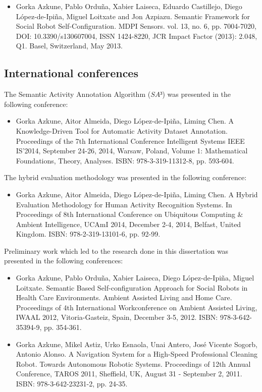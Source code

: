 \begin{itemize}
 \item Gorka Azkune, Pablo Orduña, Xabier Laiseca, Eduardo Castillejo, Diego López-de-Ipiña, Miguel Loitxate and Jon Azpiazu. Semantic Framework for Social Robot Self-Configuration. MDPI Sensors. vol. 13, no. 6, pp. 7004-7020, DOI: 10.3390/s130607004, ISSN 1424-8220, JCR Impact Factor (2013): 2.048, Q1. Basel, Switzerland, May 2013.
\end{itemize}

\subsection{International conferences}

The Semantic Activity Annotation Algorithm ($SA³$) was presented in the following conference:

\begin{itemize}
 \item Gorka Azkune, Aitor Almeida, Diego López-de-Ipiña, Liming Chen. A Knowledge-Driven Tool for Automatic Activity Dataset Annotation. Proceedings of the 7th International Conference Intelligent Systems IEEE IS’2014, September 24-26, 2014, Warsaw, Poland, Volume 1: Mathematical Foundations, Theory, Analyses. ISBN: 978-3-319-11312-8, pp. 593-604.
\end{itemize}

The hybrid evaluation methodology was presented in the following conference:

\begin{itemize}
 \item Gorka Azkune, Aitor Almeida, Diego López-de-Ipiña, Liming Chen. A Hybrid Evaluation Methodology for Human Activity Recognition Systems. In Proceedings of 8th International Conference on Ubiquitous Computing \& Ambient Intelligence, UCAmI 2014, December 2-4, 2014, Belfast, United Kingdom. ISBN: 978-2-319-13101-6, pp. 92-99.
\end{itemize}

Preliminary work which led to the research done in this dissertation was presented in the following conferences:

\begin{itemize}
 \item Gorka Azkune, Pablo Orduña, Xabier Laiseca, Diego López-de-Ipiña, Miguel Loitxate. Semantic Based Self-configuration Approach for Social Robots in Health Care Environments. Ambient Assisted Living and Home Care. Proceedings of 4th International Workconference on Ambient Assisted Living, IWAAL 2012, Vitoria-Gasteiz, Spain, December 3-5, 2012. ISBN: 978-3-642-35394-9, pp. 354-361.
 \item Gorka Azkune, Mikel Astiz, Urko Esnaola, Unai Antero, José Vicente Sogorb, Antonio Alonso. A Navigation System for a High-Speed Professional Cleaning Robot. Towards Autonomous Robotic Systems. Proceedings of 12th Annual Conference, TAROS 2011, Sheffield, UK, August 31 - September 2, 2011. ISBN: 978-3-642-23231-2, pp. 24-35.
\end{itemize}


